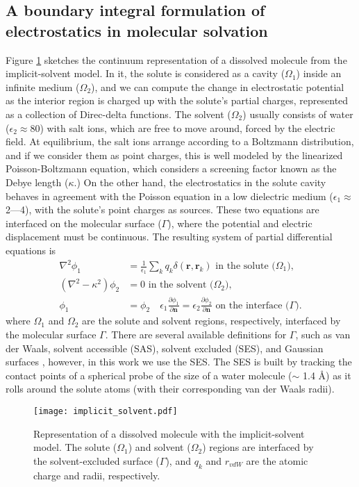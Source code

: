 \subsection{A boundary integral formulation of electrostatics in molecular solvation}

Figure \ref{fig:implicit_solvent} sketches the continuum representation of a dissolved molecule from the implicit-solvent model. 
In it, the solute is considered as a cavity ($\Omega_1$) inside an infinite medium ($\Omega_2$), and we can compute the change in electrostatic potential as the interior region is charged up with the solute's partial charges, represented as a collection of Direc-delta functions.
The solvent ($\Omega_2$) usually consists of water ($\epsilon_2\approx$80) with salt ions, which are free to move around, forced by the electric field. 
At equilibrium, the salt ions arrange according to a Boltzmann distribution, and if we consider them as point charges, this is well modeled by the linearized Poisson-Boltzmann equation, which considers a screening factor known as the Debye length ($\kappa$.) 
On the other hand, the electrostatics in the solute cavity behaves in agreement with the Poisson equation in a low dielectric medium ($\epsilon_1\approx$2---4), with the solute's point charges as sources.
These two equations are interfaced on the molecular surface ($\Gamma$), where the potential and electric displacement must be continuous.
The resulting system of partial differential equations is
%
\begin{align} \label{eq:pde}
\nabla^2\phi_1 &= \frac{1}{\epsilon_1}\sum_k q_k\delta(\mathbf{r},\mathbf{r}_k) \text{ in the solute ($\Omega_1$),}\nonumber\\
(\nabla^2-\kappa^2)\phi_2 &= 0 \text{ in the solvent ($\Omega_2$),}\nonumber\\
\phi_1 &= \phi_2 \quad \epsilon_1\frac{\partial \phi_1}{\partial\mathbf{n}} = \epsilon_2\frac{\partial \phi_2}{\partial\mathbf{n}} \text{ on the interface ($\Gamma$)}.
\end{align}
%
where $\Omega_1$ and $\Omega_2$ are the solute and solvent regions, respectively, interfaced by the molecular surface $\Gamma$.
There are several available definitions for $\Gamma$, such as van der Waals, solvent accessible (SAS), solvent excluded (SES), and Gaussian surfaces \cite{HarrisBoschitcshFenley2013}, however, in this work we use the SES.
The SES is built by tracking the contact points of a spherical probe of the size of a water molecule ($\sim$ 1.4 \AA) as it rolls around the solute atoms (with their corresponding van der Waals radii). 
%
\begin{figure}
\centering
\texttt{[image: implicit\_solvent.pdf]}
\caption{Representation of a dissolved molecule with the implicit-solvent model. The solute ($\Omega_1$) and solvent ($\Omega_2$) regions are interfaced by the solvent-excluded surface ($\Gamma$), and $q_k$ and $r_{vdW}$ are the atomic charge and radii, respectively.}
\label{fig:implicit_solvent}
\end{figure}

